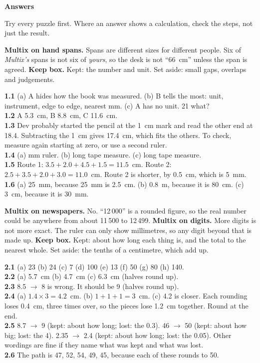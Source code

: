 \clearpage\label{answers}
{\sans\bfseries\LARGE\color{ink} Answers}\par
\small
Try every puzzle first. Where an answer shows a calculation, check the steps, not just the result.

\textbf{Multix on hand spans.} Spans are different sizes for different people. Six of \emph{Multix's} spans is not six of \emph{yours}, so the desk is not ``66~cm'' unless the span is agreed. \textbf{Keep box.} Kept: the number and unit. Set aside: small gaps, overlaps and judgements.

\textbf{1.1} (a) A hides how the book was measured. (b) B tells the most: unit, instrument, edge to edge, nearest mm. (c) A has no unit. 21 what?\\
\textbf{1.2} A 5.3~cm, B 8.8~cm, C 11.6~cm.\\
\textbf{1.3} Dev probably started the pencil at the 1~cm mark and read the other end at 18.4. Subtracting the 1~cm gives 17.4~cm, which fits the others. To check, measure again starting at zero, or use a second ruler.\\
\textbf{1.4} (a) mm ruler. (b) long tape measure. (c) long tape measure.\\
\textbf{1.5} Route 1: $3.5+2.0+4.5+1.5=11.5$~cm. Route 2: $2.5+3.5+2.0+3.0=11.0$~cm. Route 2 is shorter, by 0.5~cm, which is 5~mm.\\
\textbf{1.6} (a) 25~mm, because 25~mm is 2.5~cm. (b) 0.8~m, because it is 80~cm. (c) 3~cm, because it is 30~mm.

\textbf{Multix on newspapers.} No. ``12\,000'' is a rounded figure, so the real number could be anywhere from about 11\,500 to 12\,499. \textbf{Multix on digits.} More digits is not more exact. The ruler can only show millimetres, so any digit beyond that is made up. \textbf{Keep box.} Kept: about how long each thing is, and the total to the nearest whole. Set aside: the tenths of a centimetre, which add up.

\textbf{2.1} (a) 23 (b) 24 (c) 7 (d) 100 (e) 13 (f) 50 (g) 80 (h) 140.\\
\textbf{2.2} (a) 5.7~cm (b) 4.7~cm (c) 6.3~cm (halves round up).\\
\textbf{2.3} 8.5 $\to$ 8 is wrong. It should be 9 (halves round up).\\
\textbf{2.4} (a) $1.4\times3=4.2$~cm. (b) $1+1+1=3$~cm. (c) 4.2 is closer. Each rounding loses 0.4~cm, three times over, so the pieces lose 1.2~cm together. Round at the end.\\
\textbf{2.5} 8.7 $\to$ 9 (kept: about how long; lost: the 0.3). 46 $\to$ 50 (kept: about how big; lost: the 4). 2.35 $\to$ 2.4 (kept: about how long; lost: the 0.05). Other wordings are fine if they name what was kept and what was lost.\\
\textbf{2.6} The path is 47, 52, 54, 49, 45, because each of these rounds to 50.

